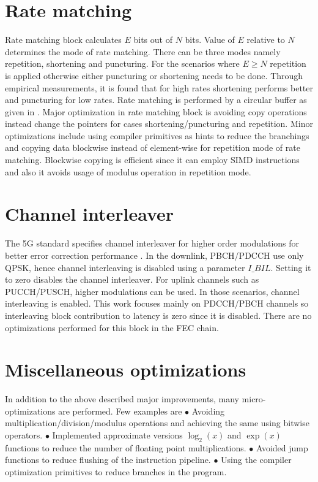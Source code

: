 \section{Rate matching}
Rate matching block calculates $E$ bits out of $N$ bits. Value of $E$ relative to $N$ determines the mode of rate matching. There can be three modes namely repetition, shortening and puncturing. For the scenarios where $E \geq N$ repetition is applied otherwise either puncturing or shortening needs to be done. Through empirical measurements, it is found that for high rates shortening performs better and puncturing for low rates. Rate matching is performed by a circular buffer as given in \cite{DesignOfPolarCodes5G}. Major optimization in rate matching block is avoiding copy operations instead change the pointers for cases shortening/puncturing and repetition. Minor optimizations include using compiler primitives as hints to reduce the branchings and copying data blockwise instead of element-wise for repetition mode of rate matching. Blockwise copying is efficient since it can employ SIMD instructions and also it avoids usage of modulus operation in repetition mode.

\section{Channel interleaver}
The 5G standard specifies channel interleaver for higher order modulations for better error correction performance \cite{3gpp.TSG-RAN_WG1}. In the downlink, PBCH/PDCCH use only QPSK, hence channel interleaving is disabled using a parameter $I\_BIL$. Setting it to zero disables the channel interleaver. For uplink channels such as PUCCH/PUSCH, higher modulations can be used. In those scenarios, channel interleaving is enabled. This work focuses mainly on PDCCH/PBCH channels so interleaving block contribution to latency is zero since it is disabled. There are no optimizations performed for this block in the FEC chain.

\section{Miscellaneous optimizations}
In addition to the above described major improvements, many micro-optimizations are performed. Few examples are \newline
$\bullet $ Avoiding multiplication/division/modulus operations and achieving the same using bitwise operators.\newline
$\bullet $ Implemented approximate versions $\log_2{(x)}$ and $\exp{(x)}$ functions to reduce the number of floating point multiplications.\newline
$\bullet $ Avoided jump functions to reduce flushing of the instruction pipeline.\newline
$\bullet $ Using the compiler optimization primitives to reduce branches in the program.\newline

